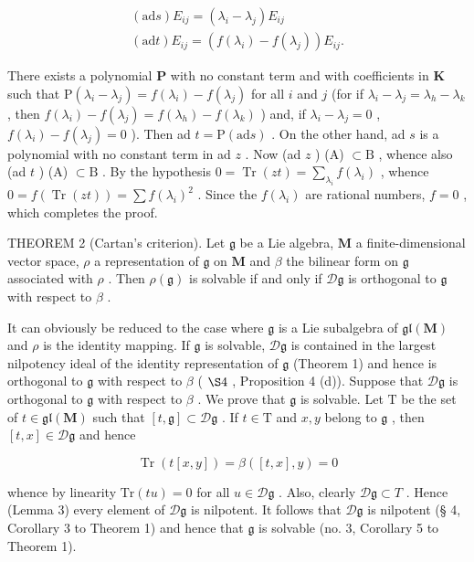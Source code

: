 \[
\begin{array}{l} (\mathrm{ad} s) E _ {i j} = (\lambda_ {i} - \lambda_ {j}) E _ {i j} \\ (\mathrm{ad} t) E _ {i j} = (f (\lambda_ {i}) - f (\lambda_ {j})) E _ {i j}. \end{array}
\]

There exists a polynomial \(\mathbf{P}\) with no constant term and with coefficients in \(\mathbf{K}\) such that \(\mathrm{P}(\lambda_i - \lambda_j) = f(\lambda_i) - f(\lambda_j)\) for all \(i\) and \(j\) (for if \(\lambda_i - \lambda_j = \lambda_h - \lambda_k\) , then \(f(\lambda_i) - f(\lambda_j) = f(\lambda_h) - f(\lambda_k)\) ) and, if \(\lambda_i - \lambda_j = 0\) , \(f(\lambda_i) - f(\lambda_j) = 0\) ). Then ad \(t = \mathrm{P}(\mathrm{ad}s)\) . On the other hand, ad \(s\) is a polynomial with no constant term in ad \(z\) . Now (ad \(z\) ) (A) \(\subset \mathrm{B}\) , whence also (ad \(t\) ) (A) \(\subset \mathrm{B}\) . By the hypothesis \(0 = \operatorname{Tr}(zt) = \sum_{\lambda_i} f(\lambda_i)\) , whence \(0 = f(\operatorname{Tr}(zt)) = \sum f(\lambda_i)^2\) . Since the \(f(\lambda_i)\) are rational numbers, \(f = 0\) , which completes the proof.

THEOREM 2 (Cartan's criterion). Let \(\mathfrak{g}\) be a Lie algebra, \(\mathbf{M}\) a finite-dimensional vector space, \(\rho\) a representation of \(\mathfrak{g}\) on \(\mathbf{M}\) and \(\beta\) the bilinear form on \(\mathfrak{g}\) associated with \(\rho\) . Then \(\rho(\mathfrak{g})\) is solvable if and only if \(\mathcal{D}\mathfrak{g}\) is orthogonal to \(\mathfrak{g}\) with respect to \(\beta\) .

It can obviously be reduced to the case where \(\mathfrak{g}\) is a Lie subalgebra of \(\mathfrak{gl}(\mathbf{M})\) and \(\rho\) is the identity mapping. If \(\mathfrak{g}\) is solvable, \(\mathcal{D}\mathfrak{g}\) is contained in the largest nilpotency ideal of the identity representation of \(\mathfrak{g}\) (Theorem 1) and hence is orthogonal to \(\mathfrak{g}\) with respect to \(\beta\) ( \(\S 4\) , Proposition 4 (d)). Suppose that \(\mathcal{D}\mathfrak{g}\) is orthogonal to \(\mathfrak{g}\) with respect to \(\beta\) . We prove that \(\mathfrak{g}\) is solvable. Let \(\mathrm{T}\) be the set of \(t\in \mathfrak{gl}(\mathbf{M})\) such that \([t,\mathfrak{g}]\subset \mathcal{D}\mathfrak{g}\) . If \(t\in \mathrm{T}\) and \(x,y\) belong to \(\mathfrak{g}\) , then \([t,x]\in \mathcal{D}\mathfrak{g}\) and hence

\[
\operatorname{Tr} (t [ x, y ]) = \beta ([ t, x ], y) = 0
\]

whence by linearity \(\mathrm{Tr}(tu) = 0\) for all \(u\in \mathcal{D}\mathfrak{g}\) . Also, clearly \(\mathcal{D}\mathfrak{g}\subset T\) . Hence (Lemma 3) every element of \(\mathcal{D}\mathfrak{g}\) is nilpotent. It follows that \(\mathcal{D}\mathfrak{g}\) is nilpotent (§ 4, Corollary 3 to Theorem 1) and hence that \(\mathfrak{g}\) is solvable (no. 3, Corollary 5 to Theorem 1).

